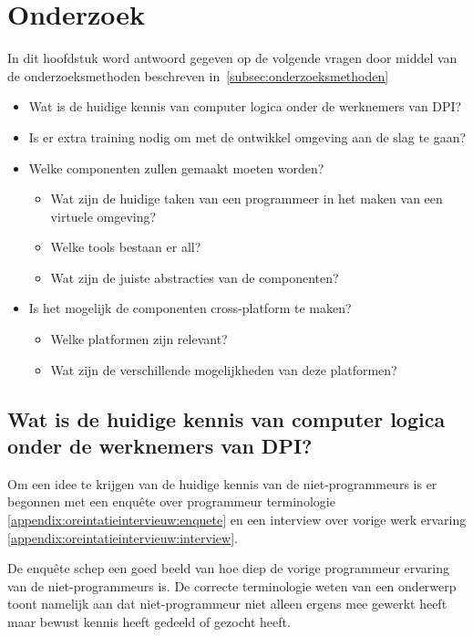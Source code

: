 \chapter{Onderzoek}
\label{ch:onderzoek}

In dit hoofdstuk word antwoord gegeven op de volgende vragen door middel van de onderzoeksmethoden beschreven in~\ref{subsec:onderzoeksmethoden}

\begin{itemize}
\item Wat is de huidige kennis van computer logica onder de werknemers van DPI?
\item Is er extra training nodig om met de ontwikkel omgeving aan de slag te gaan?
\item Welke componenten zullen gemaakt moeten worden?
	\begin{itemize}
	\item Wat zijn de huidige taken van een programmeer in het maken van een virtuele omgeving?
	\item Welke tools bestaan er all?
	\item Wat zijn de juiste abstracties van de componenten? 
	\end{itemize}
\item Is het mogelijk de componenten cross-platform te maken?
	\begin{itemize}
	\item Welke platformen zijn relevant?
	\item Wat zijn de verschillende mogelijkheden van deze platformen?
	\end{itemize}
\end{itemize}

\section{Wat is de huidige kennis van computer logica onder de werknemers van DPI?}
Om een idee te krijgen van de huidige kennis van de niet-programmeurs is er begonnen met een enquête over programmeur terminologie \ref{appendix:oreintatieintervieuw:enquete} en een interview over vorige werk ervaring \ref{appendix:oreintatieintervieuw:interview}. 

De enquête schep een goed beeld van hoe diep de vorige programmeur ervaring van de niet-programmeurs is. De correcte terminologie weten van een onderwerp toont namelijk aan dat niet-programmeur niet alleen ergens mee gewerkt heeft maar bewust kennis heeft gedeeld of gezocht heeft. 

